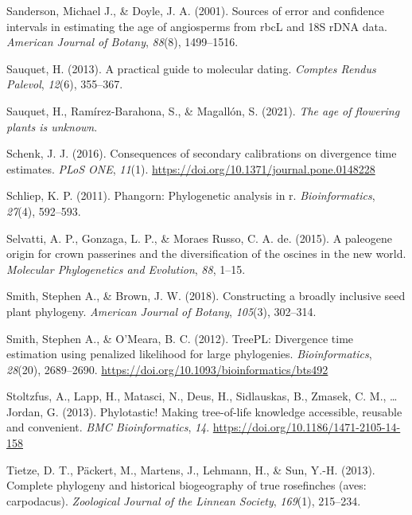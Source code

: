 \documentclass[
  man]{apa6}
\newlength{\cslhangindent}
\newlength{\cslentryspacingunit} %
\newenvironment{CSLReferences}[2] %
 {%
  \setlength{\parindent}{0pt}
  \ifodd #1
  \let\oldpar\par
  \def\par{\hangindent=\cslhangindent\oldpar}
  \fi
  \setlength{\parskip}{#2\cslentryspacingunit}
 }%
 {}
\begin{document}
\begin{CSLReferences}{1}{0}
\leavevmode{}%
Sanderson, Michael J., \& Doyle, J. A. (2001). Sources of error and confidence intervals in estimating the age of angiosperms from rbcL and 18S rDNA data. \emph{American Journal of Botany}, \emph{88}(8), 1499--1516.

\leavevmode{}%
Sauquet, H. (2013). A practical guide to molecular dating. \emph{{Comptes Rendus Palevol}}, \emph{12}(6), 355--367.

\leavevmode{}%
Sauquet, H., Ramírez-Barahona, S., \& Magallón, S. (2021). \emph{The age of flowering plants is unknown}.

\leavevmode{}%
Schenk, J. J. (2016). {Consequences of secondary calibrations on divergence time estimates}. \emph{PLoS ONE}, \emph{11}(1). \url{https://doi.org/10.1371/journal.pone.0148228}

\leavevmode{}%
Schliep, K. P. (2011). Phangorn: Phylogenetic analysis in r. \emph{Bioinformatics}, \emph{27}(4), 592--593.

\leavevmode{}%
Selvatti, A. P., Gonzaga, L. P., \& Moraes Russo, C. A. de. (2015). A paleogene origin for crown passerines and the diversification of the oscines in the new world. \emph{Molecular Phylogenetics and Evolution}, \emph{88}, 1--15.

\leavevmode{}%
Smith, Stephen A., \& Brown, J. W. (2018). Constructing a broadly inclusive seed plant phylogeny. \emph{American Journal of Botany}, \emph{105}(3), 302--314.

\leavevmode{}%
Smith, Stephen A., \& O'Meara, B. C. (2012). {TreePL: Divergence time estimation using penalized likelihood for large phylogenies}. \emph{Bioinformatics}, \emph{28}(20), 2689--2690. \url{https://doi.org/10.1093/bioinformatics/bts492}

\leavevmode{}%
Stoltzfus, A., Lapp, H., Matasci, N., Deus, H., Sidlauskas, B., Zmasek, C. M., \ldots{} Jordan, G. (2013). {Phylotastic! Making tree-of-life knowledge accessible, reusable and convenient}. \emph{{BMC Bioinformatics}}, \emph{14}. \url{https://doi.org/10.1186/1471-2105-14-158}

\leavevmode{}%
Tietze, D. T., Päckert, M., Martens, J., Lehmann, H., \& Sun, Y.-H. (2013). Complete phylogeny and historical biogeography of true rosefinches (aves: carpodacus). \emph{Zoological Journal of the Linnean Society}, \emph{169}(1), 215--234.


\end{CSLReferences}
\end{document}
